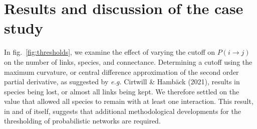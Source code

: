 \documentclass[11pt]{article}
\begin{document}
\hypertarget{results-and-discussion-of-the-case-study}{%
\section{Results and discussion of the case
study}\label{results-and-discussion-of-the-case-study}}

In fig.~\ref{fig:thresholds}, we examine the effect of varying the
cutoff on \(P(i \rightarrow j)\) on the number of links, species, and
connectance. Determining a cutoff using the maximum curvature, or
central difference approximation of the second order partial derivative,
as suggested by \emph{e.g.} Cirtwill \& Hambäck (2021), results in
species being lost, or almost all links being kept. We therefore settled
on the value that allowed all species to remain with at least one
interaction. This result, in and of itself, suggests that additional
methodological developments for the thresholding of probabilistic
networks are required.
\end{document}
